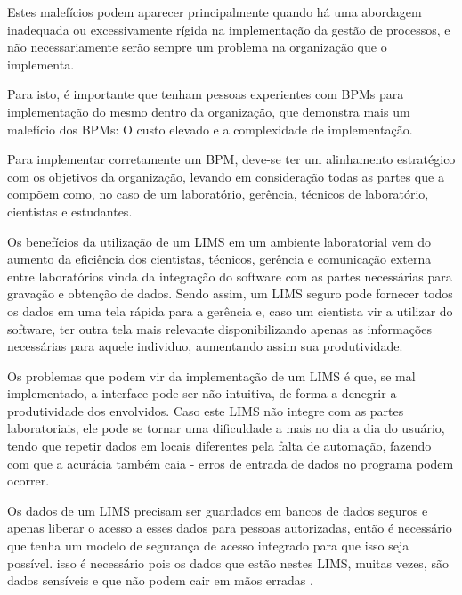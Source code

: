 Estes malefícios podem aparecer principalmente quando há uma abordagem inadequada ou excessivamente rígida na implementação da gestão de processos, e não necessariamente serão sempre um problema na organização que o implementa.

Para isto, é importante que tenham pessoas experientes com BPMs para implementação do mesmo dentro da organização, que demonstra mais um malefício dos BPMs: O custo elevado e a complexidade de implementação.

Para implementar corretamente um BPM, deve-se ter um alinhamento estratégico com os objetivos da organização, levando em consideração todas as partes que a compõem como, no caso de um laboratório, gerência, técnicos de laboratório, cientistas e estudantes.



Os benefícios da utilização de um LIMS em um ambiente laboratorial vem do aumento da eficiência dos cientistas, técnicos, gerência e comunicação externa entre laboratórios vinda da integração do software com as partes necessárias para gravação e obtenção de dados. Sendo assim, um LIMS seguro pode fornecer todos os dados em uma tela rápida para a gerência e, caso um cientista vir a utilizar do software, ter outra tela mais relevante disponibilizando apenas as informações necessárias para aquele individuo, aumentando assim sua produtividade.


Os problemas que podem vir da implementação de um LIMS é que, se mal implementado, a interface pode ser não intuitiva, de forma a denegrir a produtividade dos envolvidos. Caso este LIMS não integre com as partes laboratoriais, ele pode se tornar uma dificuldade a mais no dia a dia do usuário, tendo que repetir dados em locais diferentes pela falta de automação, fazendo com que a acurácia também caia - erros de entrada de dados no programa podem ocorrer.



Os dados de um LIMS precisam ser guardados em bancos de dados seguros e apenas liberar o acesso a esses dados para pessoas autorizadas, então é necessário que tenha um modelo de segurança de acesso integrado para que isso seja possível. isso é necessário \NO pois os dados que estão nestes LIMS, muitas vezes, são dados sensíveis e que não podem cair em mãos erradas \R \NO.

